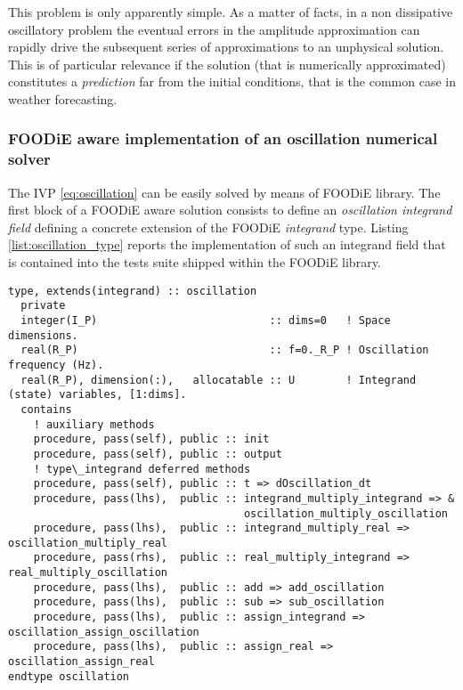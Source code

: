 \documentclass[pdftex,preprint,3p,times,numbers]{elsarticle}
\begin{document}
This problem is only apparently simple. As a matter of facts, in a non dissipative oscillatory problem the eventual errors in the amplitude approximation can rapidly drive the subsequent series of approximations to an unphysical solution. This is of particular relevance if the solution (that is numerically approximated) constitutes a \emph{prediction} far from the initial conditions, that is the common case in weather forecasting.

\subsubsection{FOODiE aware implementation of an oscillation numerical solver}
The IVP \ref{eq:oscillation} can be easily solved by means of FOODiE library. The first block of a FOODiE aware solution consists to define an \emph{oscillation integrand field} defining a concrete extension of the FOODiE \emph{integrand} type. Listing \ref{list:oscillation_type} reports the implementation of such an integrand field that is contained into the tests suite shipped within the FOODiE library.

\begin{lstlisting}[firstnumber=1,style=code,caption={implementation of the \emph{oscillation integrand} type},label={list:oscillation_type}]
type, extends(integrand) :: oscillation
  private
  integer(I_P)                           :: dims=0   ! Space dimensions.
  real(R_P)                              :: f=0._R_P ! Oscillation frequency (Hz).
  real(R_P), dimension(:),   allocatable :: U        ! Integrand (state) variables, [1:dims].
  contains
    ! auxiliary methods
    procedure, pass(self), public :: init
    procedure, pass(self), public :: output
    ! type\_integrand deferred methods
    procedure, pass(self), public :: t => dOscillation_dt
    procedure, pass(lhs),  public :: integrand_multiply_integrand => &
                                     oscillation_multiply_oscillation
    procedure, pass(lhs),  public :: integrand_multiply_real => oscillation_multiply_real
    procedure, pass(rhs),  public :: real_multiply_integrand => real_multiply_oscillation
    procedure, pass(lhs),  public :: add => add_oscillation
    procedure, pass(lhs),  public :: sub => sub_oscillation
    procedure, pass(lhs),  public :: assign_integrand => oscillation_assign_oscillation
    procedure, pass(lhs),  public :: assign_real => oscillation_assign_real
endtype oscillation
\end{lstlisting}
\end{document}
